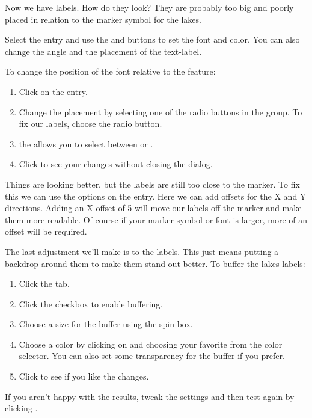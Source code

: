 Now we have labels. How do they look? They are probably too big and poorly
placed in relation to the marker symbol for the lakes.

Select the  entry and use the  and 
buttons to set the font and color. You can also change the angle and the
placement of the text-label.

To change the position of the font relative to the feature:

\begin{enumerate} 
\item Click on the  entry.
\item Change the placement by selecting one of the radio buttons
in the  group. To fix our labels, choose the
 radio button.
\item the  allows you to select between
 or .
\item Click  to see your changes without closing the dialog.
\end{enumerate} 

Things are looking better, but the labels are still too close to the marker. To
fix this we can use the options on the  entry. Here we can add
offsets for the X and Y directions. Adding an X offset of 5 will move our
labels off the marker and make them more readable. Of course if your marker
symbol or font is larger, more of an offset will be required.

The last adjustment we'll make is to  the labels. This just means
putting a backdrop around them to make them stand out better. To buffer the
lakes labels:

\begin{enumerate}
\item Click the  tab.
\item Click the  checkbox to enable buffering.
\item Choose a size for the buffer using the spin box.
\item Choose a color by clicking on  and choosing your
  favorite from the color selector. You can also set some transparency for the
  buffer if you prefer.
\item Click  to see if you like the changes.
\end{enumerate} 

If you aren't happy with the results, tweak the settings and then test again
by clicking .

